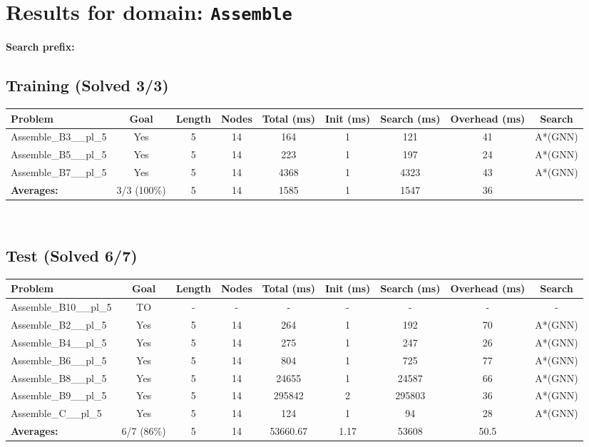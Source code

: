 \documentclass{article}
\begin{document}
\section*{Results for domain: \texttt{Assemble}}
\textbf{Search prefix:} 
\\[0.5cm]
\subsection*{Training (Solved 3/3)}
\begin{tabular}{lcccccccc}
\toprule
Problem & Goal & Length & Nodes & Total (ms) & Init (ms) & Search (ms) & Overhead (ms) & Search \\
\midrule
Assemble\_B3\_\_pl\_5 & Yes & 5 & 14 & 164 & 1 & 121 & 41 & A*(GNN) \\
Assemble\_B5\_\_pl\_5 & Yes & 5 & 14 & 223 & 1 & 197 & 24 & A*(GNN) \\
Assemble\_B7\_\_pl\_5 & Yes & 5 & 14 & 4368 & 1 & 4323 & 43 & A*(GNN) \\
\textbf{Averages:} & 3/3 (100\%) & 5 & 14 & 1585 & 1 & 1547 & 36 & \\
\bottomrule
\end{tabular}
\\[0.7cm]
\subsection*{Test (Solved 6/7)}
\begin{tabular}{lcccccccc}
\toprule
Problem & Goal & Length & Nodes & Total (ms) & Init (ms) & Search (ms) & Overhead (ms) & Search \\
\midrule
Assemble\_B10\_\_pl\_5 & TO & - & - & - & - & - & - & - \\
Assemble\_B2\_\_pl\_5 & Yes & 5 & 14 & 264 & 1 & 192 & 70 & A*(GNN) \\
Assemble\_B4\_\_pl\_5 & Yes & 5 & 14 & 275 & 1 & 247 & 26 & A*(GNN) \\
Assemble\_B6\_\_pl\_5 & Yes & 5 & 14 & 804 & 1 & 725 & 77 & A*(GNN) \\
Assemble\_B8\_\_pl\_5 & Yes & 5 & 14 & 24655 & 1 & 24587 & 66 & A*(GNN) \\
Assemble\_B9\_\_pl\_5 & Yes & 5 & 14 & 295842 & 2 & 295803 & 36 & A*(GNN) \\
Assemble\_C\_\_pl\_5 & Yes & 5 & 14 & 124 & 1 & 94 & 28 & A*(GNN) \\
\textbf{Averages:} & 6/7 (86\%) & 5 & 14 & 53660.67 & 1.17 & 53608 & 50.5 & \\
\bottomrule
\end{tabular}
\\[0.7cm]
\end{document}
